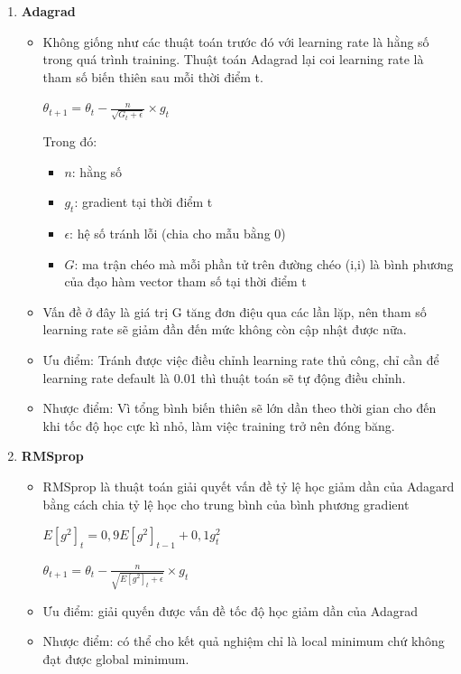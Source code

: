 \begin{enumerate}
    \item \textbf{Adagrad}
    \begin{itemize}
        \item Không giống như các thuật toán trước đó với learning rate là hằng số trong quá trình training. Thuật toán Adagrad lại coi learning rate là tham số biến thiên sau mỗi thời điểm t.

        \begin{center}
                \large $\theta_{t + 1} = \theta_{t} - \frac{n}{\sqrt{G_{t}+\epsilon}} \times  g_{t}$
            \end{center}
        Trong đó:
        \begin{itemize}
        \item $n$: hằng số
        \item $g_{t}$: gradient tại thời điểm t
        \item $\epsilon$: hệ số tránh lỗi (chia cho mẫu bằng 0)
        \item $G$: ma trận chéo mà mỗi phần tử trên đường chéo (i,i) là bình phương của đạo hàm vector tham số tại thời điểm t
        \end{itemize}

        
        \item Vấn đề ở đây là giá trị G tăng đơn điệu qua các lần lặp, nên tham số learning rate sẽ giảm đần đến mức không còn cập nhật được nữa.
        \item Ưu điểm: Tránh được việc điều chỉnh learning rate thủ công, chỉ cần để learning rate default là 0.01 thì thuật toán sẽ tự động điều chỉnh.
        \item Nhược điểm: Vì tổng bình biến thiên sẽ lớn dần theo thời gian cho đến khi tốc độ học cực kì nhỏ, làm việc training trở nên đóng băng.
    \end{itemize}
    
    \item \textbf{RMSprop}
    \begin{itemize}
        \item RMSprop là thuật toán giải quyết vấn đề tỷ lệ học giảm dần của Adagard bằng cách chia tỷ lệ học cho trung bình của bình phương gradient
        \begin{center}
                \large $E[g^{2}]_{t} = 0,9E[g^{2}]_{t-1}+0,1g^{2}_{t}$
         \end{center}
         \begin{center}
                \large $\theta_{t + 1} = \theta_{t} - \frac{n}{\sqrt{E[g^{2}]_{t}+\epsilon}} \times  g_{t}$
         \end{center}
        \item Ưu điểm: giải quyến được vấn đề tốc độ học giảm dần của Adagrad
        \item Nhược điểm: có thể cho kết quả nghiệm chỉ là local minimum chứ không đạt được global minimum.
    \end{itemize}
    

\end{enumerate}
